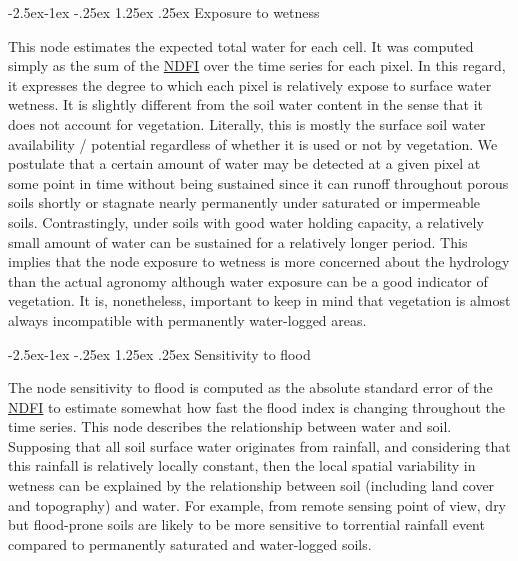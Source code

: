 \documentclass[12pt,oneside]{article}
\makeatletter
\renewcommand\paragraph{\@startsection{paragraph}{4}{\z@}%
            {-2.5ex\@plus -1ex \@minus -.25ex}%
            {1.25ex \@plus .25ex}%
            {\normalfont\normalsize\bfseries}}
\makeatother
\begin{document}
\hypertarget{I522}{%
\paragraph{Exposure to wetness}\label{I522}}

This node estimates the expected total water for each cell. It was computed simply as the sum of the \href{http://journals.plos.org/plosone/article/file?id=10.1371/journal.pone.0088741\&type=printable}{NDFI} over the time series for each pixel. In this regard, it expresses the degree to which each pixel is relatively expose to surface water wetness. It is slightly different from the soil water content in the sense that it does not account for vegetation. Literally, this is mostly the surface soil water availability / potential regardless of whether it is used or not by vegetation. We postulate that a certain amount of water may be detected at a given pixel at some point in time without being sustained since it can runoff throughout porous soils shortly or stagnate nearly permanently under saturated or impermeable soils. Contrastingly, under soils with good water holding capacity, a relatively small amount of water can be sustained for a relatively longer period. This implies that the node exposure to wetness is more concerned about the hydrology than the actual agronomy although water exposure can be a good indicator of vegetation. It is, nonetheless, important to keep in mind that vegetation is almost always incompatible with permanently water-logged areas.

\hypertarget{I523}{%
\paragraph{Sensitivity to flood}\label{I523}}

The node sensitivity to flood is computed as the absolute standard error of the \href{http://journals.plos.org/plosone/article/file?id=10.1371/journal.pone.0088741\&type=printable}{NDFI} to estimate somewhat how fast the flood index is changing throughout the time series. This node describes the relationship between water and soil. Supposing that all soil surface water originates from rainfall, and considering that this rainfall is relatively locally constant, then the local spatial variability in wetness can be explained by the relationship between soil (including land cover and topography) and water. For example, from remote sensing point of view, dry but flood-prone soils are likely to be more sensitive to torrential rainfall event compared to permanently saturated and water-logged soils.
\end{document}
